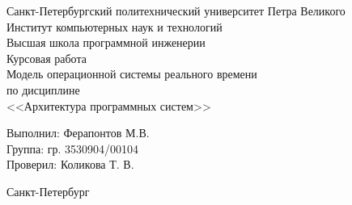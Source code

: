 \begin{titlepage}	%

	\begin{center}		%

		\large Санкт-Петербургский политехнический университет Петра Великого\\
		\large Институт компьютерных наук и технологий\\
		\large Высшая школа программной инженерии \\[6cm]

    \huge Курсовая работа \\%
		\large Модель операционной системы реального времени \\ [0.5cm]
		\large по дисциплине\\[0.1cm]
		\large <<Архитектура программных систем>>\\[5cm]

	\end{center}

		\noindent\large Выполнил: \hfill \large Ферапонтов М.В.\\
		\noindent\large Группа: \hfill \large гр. 3530904/00104\\

		\noindent\large Проверил: \hfill \large Коликова Т. В.

	\vfill %

	\begin{center}
	\large Санкт-Петербург\\
	\large \the\year %
	\end{center} %

\end{titlepage} %

\vfill %
